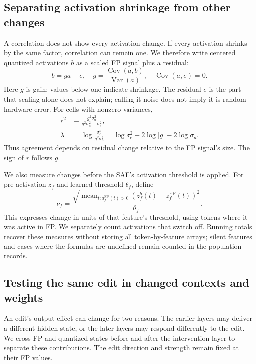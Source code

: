 \documentclass[11pt]{article}
\newcommand{\FP}{\mathrm{FP}}
\begin{document}
\subsection{Separating activation shrinkage from other changes}
A correlation does not show every activation change. If every activation shrinks by the same factor, correlation can remain one. We therefore write centered quantized activations $b$ as a scaled FP signal plus a residual:
\begin{equation}
 b=ga+e,\quad g=\frac{\operatorname{Cov}(a,b)}{\operatorname{Var}(a)},\quad\operatorname{Cov}(a,e)=0.
\end{equation}
Here $g$ is gain: values below one indicate shrinkage. The residual $e$ is the part that scaling alone does not explain; calling it noise does not imply it is random hardware error. For cells with nonzero variances,
\begin{align}
 r^2&=\frac{g^2\sigma_a^2}{g^2\sigma_a^2+\sigma_e^2},\label{eq:r}\\
 \lambda&=\log\frac{\sigma_e^2}{g^2\sigma_a^2}
 =\log\sigma_e^2-2\log|g|-2\log\sigma_a.\label{eq:lambda}
\end{align}
Thus agreement depends on residual change relative to the FP signal's size. The sign of $r$ follows $g$.

We also measure changes before the SAE's activation threshold is applied. For pre-activation $z_f$ and learned threshold $\theta_f$, define
\begin{equation}
 \nu_f=\frac{\sqrt{\operatorname{mean}_{t:a_f^\FP(t)>0}(z_f^b(t)-z_f^\FP(t))^2}}{\theta_f}.\label{eq:nu}
\end{equation}
This expresses change in units of that feature's threshold, using tokens where it was active in FP. We separately count activations that switch off. Running totals recover these measures without storing all token-by-feature arrays; silent features and cases where the formulas are undefined remain counted in the population records.

\subsection{Testing the same edit in changed contexts and weights}
An edit's output effect can change for two reasons. The earlier layers may deliver a different hidden state, or the later layers may respond differently to the edit. We cross FP and quantized states before and after the intervention layer to separate these contributions. The edit direction and strength remain fixed at their FP values.
\end{document}
